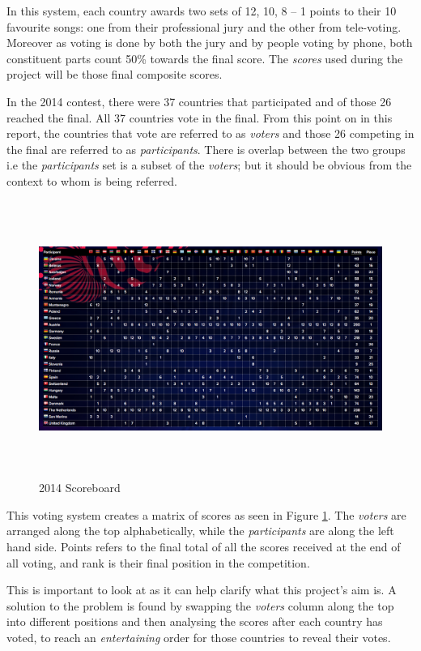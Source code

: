 \documentclass[12pt]{report}
\begin{document}
In this system, each country awards two sets of 12, 10, 8 – 1 points to their 10 favourite songs: one from their professional jury and the other from tele-voting. Moreover as voting is done by both the jury and by people voting by phone, both constituent parts count 50\% towards the final score. The \textit{scores} used during the project will be those final composite scores.

In the 2014 contest, there were 37 countries that participated and of those 26 reached the final. All 37 countries vote in the final. From this point on in this report, the countries that vote are referred to as \textit{voters} and those 26 competing in the final are referred to as \textit{participants}. There is overlap between the two groups i.e the \textit{participants} set is a subset of the \textit{voters}; but it should be obvious from the context to whom is being referred.

\begin{figure}[H]
\centering
\includegraphics[width=16cm, height=9cm]{./2014Scoreboard}
\caption{2014 Scoreboard}
\label{f_2014Scores}
\end{figure}

This voting system creates a matrix of scores as seen in Figure \ref{f_2014Scores}\cite{EurovisionScoreboard}. The \textit{voters} are arranged along the top alphabetically, while the \textit{participants} are along the left hand side. Points refers to the final total of all the scores received at the end of all voting, and rank is their final position in the competition. 

This is important to look at as it can help clarify what this project's aim is. A solution to the problem is found by swapping the \textit{voters} column along the top into different positions and then analysing the scores after each country has voted, to reach an \textit{entertaining} order for those countries to reveal their votes.
\end{document}
